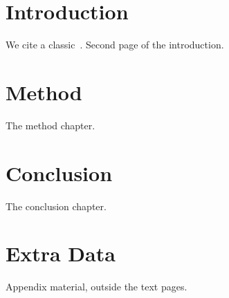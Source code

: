 \documentclass[11pt]{report}
\begin{document}
\begin{titlepage}\centering\vspace*{5cm}{\Huge A Report}\end{titlepage}
\tableofcontents
\clearpage{}
\chapter{Introduction}
We cite a classic~\cite{knuth1984}.
\newpage
Second page of the introduction.
\chapter{Method}
The method chapter.
\chapter{Conclusion}
The conclusion chapter.
\printbibliography[heading=bibintoc]
\appendix
\chapter{Extra Data}
Appendix material, outside the text pages.
\end{document}
